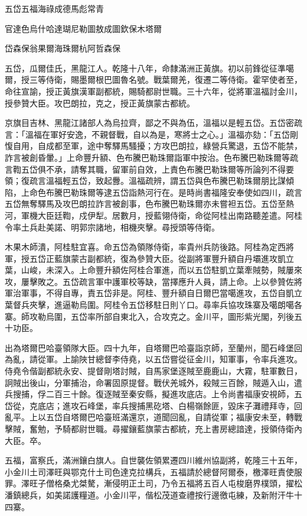 
\begin{pinyinscope}
五岱五福海祿成德馬彪常青

官達色烏什哈達瑚尼勒圖敖成圖欽保木塔爾

岱森保翁果爾海珠爾杭阿哲森保

五岱，瓜爾佳氏，黑龍江人。乾隆十八年，命隸滿洲正黃旗。初以前鋒從征準噶爾，授三等侍衛，賜墨爾根巴圖魯名號。戰葉爾羌，復遷二等侍衛。霍罕使者至，命往宣諭，授正黃旗漢軍副都統，賜騎都尉世職。三十六年，從將軍溫福討金川，授參贊大臣。攻巴朗拉，克之，授正黃旗蒙古都統。

京旗目吉林、黑龍江諸部人為烏拉齊，鄙之不與為伍，溫福以是輕五岱。五岱密疏言：「溫福在軍好安逸，不親督戰，自以為是，寒將士之心。」溫福亦劾：「五岱剛愎自用，自成都至軍，途中奪驛馬騷擾；方攻巴朗拉，綠營兵驚退，五岱不能禁，詐言被創昏暈。」上命豐升額、色布騰巴勒珠爾詣軍中按治。色布騰巴勒珠爾等疏言鞫五岱俱不承，請奪其職，留軍前自效，上責色布騰巴勒珠爾等所論列不得要領；復疏言溫福輕五岱，致起釁。溫福疏辨，謂五岱與色布騰巴勒珠爾朋比謀傾陷，上命色布騰巴勒珠爾等逮五岱詣熱河行在。是時尚書福隆安奉使如四川，疏言五岱無奪驛馬及攻巴朗拉詐言被創事，色布騰巴勒珠爾亦未嘗袒五岱。五岱至熱河，軍機大臣廷鞫，戍伊犁。居數月，授藍翎侍衛，命從阿桂出南路聽差遣。阿桂令率土兵赴美諾、明郭宗諸地，相機夾擊。尋授頭等侍衛。

木果木師潰，阿桂駐宜喜。命五岱為領隊侍衛，率貴州兵防後路。阿桂為定西將軍，授五岱正藍旗蒙古副都統，復為參贊大臣。從副將軍豐升額自丹壩進攻凱立葉，山峻，未深入。上命豐升額佐阿桂合軍進，而以五岱駐凱立葉牽賊勢，賊屢來攻，屢擊敗之。五岱疏言軍中護軍校等缺，當擇應升人員，請上命。上以參贊佐將軍治軍事，不得自專，責五岱非是。阿桂、豐升額自日爾巴當噶進攻，五岱自凱立葉督兵夾擊，進逼勒烏圍。阿桂令五岱移駐日則丫口。尋率兵協攻珠寨及噶朗噶各寨。師攻勒烏圍，五岱率所部自東北入，合攻克之。金川平，圖形紫光閣，列後五十功臣。

出為塔爾巴哈臺領隊大臣。四十九年，自塔爾巴哈臺詣京師，至蘭州，聞石峰堡回為亂，請從軍。上諭陜甘總督李侍堯，以五岱嘗從征金川，知軍事，令率兵進攻。侍堯令偕副都統永安、提督剛塔討賊，自馬家堡逐賊至鹿鹿山，大霧，駐軍數日，詗賊出後山，分軍捕治，命署固原提督。戰伏羌城外，殺賊三百餘，賊遁入山，遣兵搜捕，俘二百三十餘。復逐賊至秦安縣，擬進攻底店。上令尚書福康安視師，五岱從，克底店；進攻石峰堡，率兵搜捕黑矻塔、白楊嶺餘匪，毀床子灘禮拜寺，回亂平。上以五岱自塔爾巴哈臺班滿還京，道聞回亂，自請從軍；福康安未至，轉戰擊賊，奮勉，予騎都尉世職。尋擢鑲藍旗蒙古都統，充上書房總諳達，授領侍衛內大臣。卒。

五福，富察氏，滿洲鑲白旗人。自世襲佐領累遷四川維州協副將，乾隆三十五年，小金川土司澤旺與鄂克什土司色達克拉構兵，五福請於總督阿爾泰，檄澤旺責使服罪。澤旺子僧格桑尤桀驁，漸侵明正土司，乃令五福將五百人屯梭磨界樸頭，擢松潘鎮總兵，如美諾護糧道。小金川平，偕松茂道查禮按行邊徼屯練，及新附汗牛十四寨。


\end{pinyinscope}
